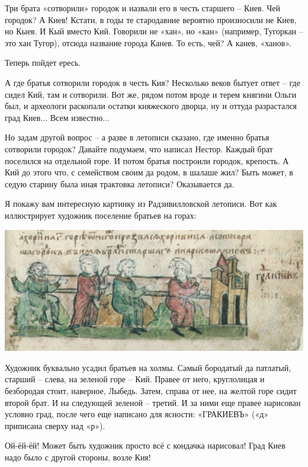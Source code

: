 Три брата «сотворили» городок и назвали его в честь старшего – Киев. Чей городок? А Киев! Кстати, в годы те стародавние вероятно произносили не Киев, но Кыев. И Кый вместо Кий. Говорили не «хан», но «кан» (например, Тугоркан – это хан Тугор), отсюда название города Канев. То есть, чей? А канев, «ханов».

Теперь пойдет ересь.

А где братья сотворили городок в честь Кия? Несколько веков бытует ответ – где сидел Кий, там и сотворили. Вот же, рядом потом вроде и терем княгини Ольги был, и археологи раскопали остатки княжеского дворца, ну и оттуда разрастался град Киев... Всем известно...

Но задам другой вопрос – а разве в летописи сказано, где именно братья сотворили городок? Давайте подумаем, что написал Нестор. Каждый брат поселился на отдельной горе. И потом братья построили городок, крепость. А Кий до этого что, с семейством своим да родом, в шалаше жил? Быть может, в седую старину была иная трактовка летописи? Оказывается да.

Я покажу вам интересную картинку из Радзивилловской летописи. Вот как иллюстрирует художник поселение братьев на горах:

\begin{center}
\includegraphics[width=\linewidth]{chast-colebanie-osnov/grad-kiev-urk/radz-tri-brata.jpg}
\end{center} 

Художник буквально усадил братьев на холмы. Самый бородатый да патлатый, старший – слева, на зеленой горе – Кий. Правее от него, круглолицая и безбородая стоит, наверное, Лыбедь. Затем, справа от нее, на желтой горе сидит второй брат. И на следующей зеленой – третий. И за ними еще правее нарисован условно град, после чего еще написано для ясности: «ГРАКИЕВЪ» («д» приписана сверху над «р»).

Ой-ёй-ёй! Может быть художник просто всё с кондачка нарисовал! Град Киев надо было с другой стороны, возле Кия!

